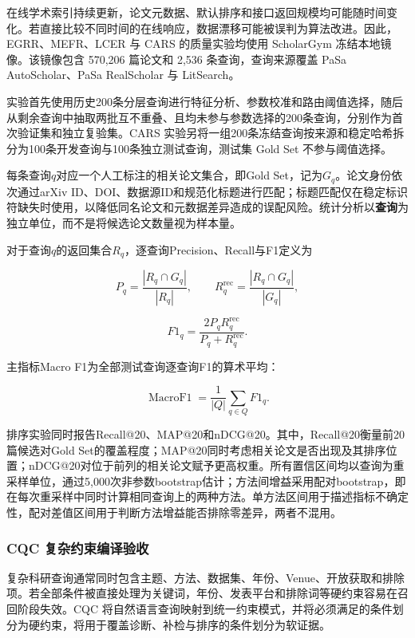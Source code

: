 \documentclass[a4paper,12pt,fontset=none]{ctexart}
\begin{document}
在线学术索引持续更新，论文元数据、默认排序和接口返回规模均可能随时间变化。若直接比较不同时间的在线响应，数据漂移可能被误判为算法改进。因此，EGRR、MEFR、LCER 与 CARS 的质量实验均使用 ScholarGym 冻结本地镜像。该镜像包含 570,206 篇论文和 2,536 条查询，查询来源覆盖 PaSa AutoScholar、PaSa RealScholar 与 LitSearch。

实验首先使用历史200条分层查询进行特征分析、参数校准和路由阈值选择，随后从剩余查询中抽取两批互不重叠、且均未参与参数选择的200条查询，分别作为首次验证集和独立复验集。CARS 实验另将一组200条冻结查询按来源和稳定哈希拆分为100条开发查询与100条独立测试查询，测试集 Gold Set 不参与阈值选择。

每条查询$q$对应一个人工标注的相关论文集合，即Gold Set，记为$G_q$。论文身份依次通过arXiv ID、DOI、数据源ID和规范化标题进行匹配；标题匹配仅在稳定标识符缺失时使用，以降低同名论文和元数据差异造成的误配风险。统计分析以\textbf{查询}为独立单位，而不是将候选论文数量视为样本量。

对于查询$q$的返回集合$R_q$，逐查询Precision、Recall与F1定义为

\begin{equation}
	P_q=\frac{|R_q\cap G_q|}{|R_q|},
	\qquad
	R_q^{\mathrm{rec}}=\frac{|R_q\cap G_q|}{|G_q|},
\end{equation}

\begin{equation}
	F1_q=
	\frac{2P_qR_q^{\mathrm{rec}}}
	{P_q+R_q^{\mathrm{rec}}}.
\end{equation}

主指标Macro F1为全部测试查询逐查询F1的算术平均：

\begin{equation}
	\operatorname{MacroF1}
	=
	\frac{1}{|Q|}
	\sum_{q\in Q}F1_q.
\end{equation}

排序实验同时报告Recall@20、MAP@20和nDCG@20。其中，Recall@20衡量前20篇候选对Gold Set的覆盖程度；MAP@20同时考虑相关论文是否出现及其排序位置；nDCG@20对位于前列的相关论文赋予更高权重。所有置信区间均以查询为重采样单位，通过5,000次非参数bootstrap估计；方法间增益采用配对bootstrap，即在每次重采样中同时计算相同查询上的两种方法。单方法区间用于描述指标不确定性，配对差值区间用于判断方法增益能否排除零差异，两者不混用。

\subsubsection{CQC 复杂约束编译验收}

复杂科研查询通常同时包含主题、方法、数据集、年份、Venue、开放获取和排除项。若全部条件被直接处理为关键词，年份、发表平台和排除词等硬约束容易在召回阶段失效。CQC 将自然语言查询映射到统一约束模式，并将必须满足的条件划分为硬约束，将用于覆盖诊断、补检与排序的条件划分为软证据。
\end{document}
